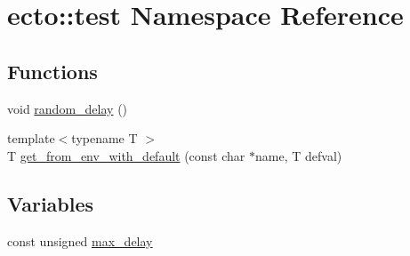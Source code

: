 \hypertarget{namespaceecto_1_1test}{\section{ecto\-:\-:test Namespace Reference}
\label{namespaceecto_1_1test}
}
\subsection*{Functions}
\begin{DoxyCompactItemize}
\item 
void \hyperlink{namespaceecto_1_1test_ab6aaaa31355ed0c3c07380853b4ee174}{random\-\_\-delay} ()
\item 
{\footnotesize template$<$typename T $>$ }\\T \hyperlink{namespaceecto_1_1test_abdfa3ef5cd4f48e6a428bf0d8c500450}{get\-\_\-from\-\_\-env\-\_\-with\-\_\-default} (const char $\ast$name, T defval)
\end{DoxyCompactItemize}
\subsection*{Variables}
\begin{DoxyCompactItemize}
\item 
const unsigned \hyperlink{namespaceecto_1_1test_ae34aab3f49c4e0d8ba421135cafca312}{max\-\_\-delay}
\end{DoxyCompactItemize}


